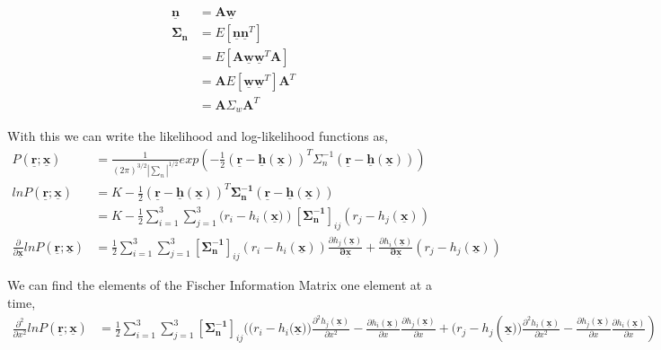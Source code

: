 \documentclass[a4 paper]{article}
\begin{document}
\begin{align*}
\mathbf{\underline{n}} &= \mathbf{A}\mathbf{\underline{w}}
\\ \mathbf{\Sigma_{n}} &= E[\mathbf{\underline{n}}\mathbf{\underline{n}}^{T}]
\\ &=  E[\mathbf{A}\mathbf{\underline{w}}\mathbf{\underline{w}}^{T}\mathbf{A}]
\\ &= \mathbf{A}E[\mathbf{\underline{w}}\mathbf{\underline{w}}^{T}]\mathbf{A}^{T}
\\ &= \mathbf{A}\Sigma_{w}\mathbf{A}^{T}
\end{align*}

With this we can write the likelihood and log-likelihood functions as,
\begin{align*}
P(\mathbf{\underline{r}}; \mathbf{\underline{x}}) &= \frac{1}{(2\pi)^{3/2}|\sum_{n}|^{1/2}}exp(-\frac{1}{2}(\mathbf{\underline{r}}-\mathbf{\underline{h}(\mathbf{\underline{x}})})^{T}\Sigma_{n}^{-1}(\mathbf{\underline{r}}-\mathbf{\underline{h}(\mathbf{\underline{x}})}))
\\ ln P(\mathbf{\underline{r}}; \mathbf{\underline{x}}) &=  K -\frac{1}{2}(\mathbf{\underline{r}}-\mathbf{\underline{h}(\mathbf{\underline{x}})})^{T}\mathbf{\Sigma_{n}^{-1}}(\mathbf{\underline{r}}-\mathbf{\underline{h}(\mathbf{\underline{x}})})
\\ &= K - \frac{1}{2} \sum_{i =1}^{3}\sum_{j=1}^{3}(r_{i} - h_{i}(\mathbf{\underline{x})})[\mathbf{\Sigma_{n}^{-1}}]_{ij}(r_{j} - h_{j}(\mathbf{\underline{x}}))
\\ \frac{\partial}{\partial\mathbf{\underline{x}}}ln P(\mathbf{\underline{r}}; \mathbf{\underline{x}}) &= \frac{1}{2}\sum_{i =1}^{3}\sum_{j=1}^{3} [\mathbf{\Sigma_{n}^{-1}}]_{ij}(r_{i} - h_{i}(\mathbf{\underline{x}}))\frac{\partial h_{j}(\mathbf{\underline{x}})}{\mathbf{\partial\underline{x}}} + \frac{\partial h_{i}(\mathbf{\underline{x}})}{\mathbf{\partial\underline{x}}}(r_{j} - h_{j}(\mathbf{\underline{x}}))
\end{align*}

We can find the elements of the Fischer Information Matrix one element at a time,
\begin{align*}
\frac{\partial^{2}}{\partial x^{2}}ln P(\mathbf{\underline{r}}; \mathbf{\underline{x}})  &= \frac{1}{2}\sum_{i =1}^{3}\sum_{j=1}^{3} [\mathbf{\Sigma_{n}^{-1}}]_{ij} ((r_{i} - h_{i}(\mathbf{\underline{x}))}\frac{\partial^{2} h_{j}(\mathbf{\underline{x}})}{\partial x^{2}}-\frac{\partial h_{i}(\mathbf{\underline{x}})}{\partial x}\frac{\partial h_{j}(\mathbf{\underline{x}})}{\partial x} + (r_{j} - h_{j}(\mathbf{\underline{x}))}\frac{\partial^{2} h_{i}(\mathbf{\underline{x}})}{\partial x^{2}}-\frac{\partial h_{j}(\mathbf{\underline{x}})}{\partial x}\frac{\partial h_{i}(\mathbf{\underline{x}})}{\partial x})
\end{align*}
\end{document}
